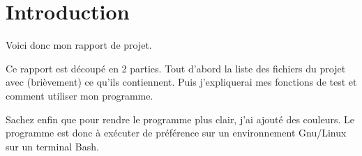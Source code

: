 \chapter{Introduction}

Voici donc mon rapport de projet.

Ce rapport est découpé en 2 parties.
Tout d'abord la liste des fichiers du projet avec (brièvement) ce qu'ils contiennent.
Puis j'expliquerai mes fonctions de test et comment utiliser mon programme.

Sachez enfin que pour rendre le programme plus clair, j'ai ajouté des couleurs. 
Le programme est donc à exécuter de préférence sur un environnement Gnu/Linux sur un terminal Bash. 

\clearpage
